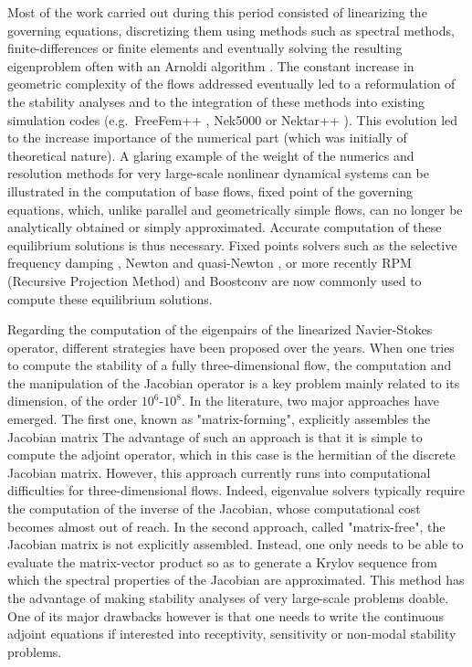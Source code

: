 Most of the work carried out during this period consisted of linearizing the governing equations, discretizing them using methods such as spectral methods, finite-differences or finite elements and eventually solving the resulting eigenproblem often with an Arnoldi algorithm \cite{A1951,NO1993,LSY97}. The constant increase in geometric complexity of the flows addressed eventually led to a reformulation of the stability analyses and to the integration of these methods into existing simulation codes (e.g.\ FreeFem++ \cite{H2012}, Nek5000 \cite{FKMTLK08} or Nektar++ \cite{KS2005}). This evolution led to the increase importance of the numerical part (which was initially of theoretical nature). A glaring example of the weight of the numerics and resolution methods for very large-scale nonlinear dynamical systems can be illustrated in the computation of base flows, fixed point of the governing equations, which, unlike parallel and geometrically simple flows, can no longer be analytically obtained or simply approximated. Accurate computation of these equilibrium solutions is thus necessary. Fixed points solvers such as the selective frequency damping \cite{pof:akervik:2006}, Newton \cite{PW1998} and quasi-Newton \cite{SB2002}, or more recently RPM (Recursive Projection Method) \cite{siam:shroff:1993} and Boostconv \cite{citro2017efficient} are now commonly used to compute these equilibrium solutions.

Regarding the computation of the eigenpairs of the linearized Navier-Stokes operator, different strategies have been proposed over the years. When one tries to compute the stability of a fully three-dimensional flow, the computation and the manipulation of the Jacobian operator is a key problem mainly related to its dimension, of the order $10^6$-$10^8$. In the literature, two major approaches have emerged. The first one, known as "matrix-forming", explicitly assembles the Jacobian matrix The advantage of such an approach is that it is simple to compute the adjoint operator, which in this case is the hermitian of the discrete Jacobian matrix. However, this approach currently runs into computational difficulties for three-dimensional flows. Indeed, eigenvalue solvers typically require the computation of the inverse of the Jacobian, whose computational cost becomes almost out of reach. In the second approach, called "matrix-free", the Jacobian matrix is not explicitly assembled. Instead, one only needs to be able to evaluate the matrix-vector product so as to generate a Krylov sequence from which the spectral properties of the Jacobian are approximated. This method has the advantage of making stability analyses of very large-scale problems doable. One of its major drawbacks however is that one needs to write the continuous adjoint equations if interested into receptivity, sensitivity or non-modal stability problems.

